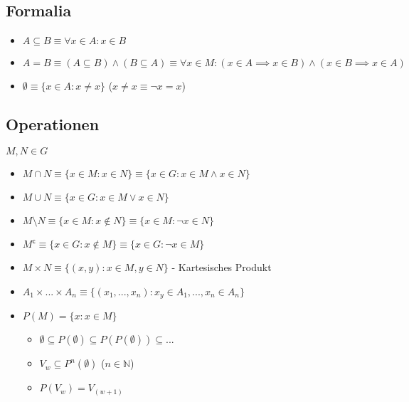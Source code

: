 \documentclass[12pt]{scrreprt}
\begin{document}
            \subsection{Formalia}
                \label{ss:grundbegriffe_mengen_formalia}

                \begin{itemize}
                    \item $ A \subseteq B \equiv \forall x \in A : x \in B $
                    \item $ A = B \equiv (A \subseteq B) \land (B \subseteq A) \equiv \forall x \in M : (x \in A \implies x \in B ) \land (x \in B \implies x \in A) $
                    \item $ \emptyset \equiv \{ x \in A : x \neq x \} $ ($ x \neq x \equiv \lnot x = x $)
                \end{itemize}


            \subsection{Operationen}
                \label{ss:grundbegriffe_mengen_operationen}

                $ M, N \in G $

                \begin{itemize}
                    \item $ M \cap N \equiv \{ x \in M : x \in N \} \equiv \{ x \in G : x \in M \land x \in N \} $
                    \item $ M \cup N \equiv \{ x \in G : x \in M \lor x \in N \} $
                    \item $ M \setminus N \equiv \{ x \in M : x \not\in N \} \equiv \{ x \in M : \lnot x \in N \} $
                    \item $ M ^ \mathsf{c} \equiv \{ x \in G : x \not\in M \} \equiv \{ x \in G : \lnot x \in M \} $
                    \item $ M \times N \equiv \{ (x, y) : x \in M , y \in N \} $ - Kartesisches Produkt
                    \item $ A _ 1 \times ... \times A _ n \equiv \{ (x _ 1, ..., x _ n) : x _ y \in A _ 1, ..., x _ n \in A _ n \} $
                    \item $ P(M) = \{ x : x \in M \} $
                    \begin{itemize}
                        \item $ \emptyset \subseteq P(\emptyset) \subseteq P(P(\emptyset)) \subseteq ... $
                        \item $ V _ w \subseteq P ^ n (\emptyset) $ ($ n \in \mathbb{N} $)
                        \item $ P(V _ w) = V _ (w + 1) $
                    \end{itemize}
                \end{itemize}
\end{document}
